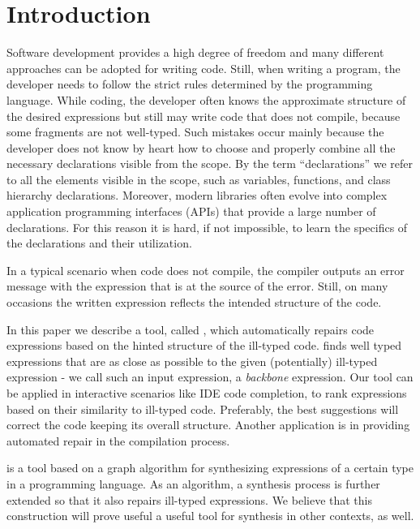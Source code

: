 \section{Introduction}
\label{sec:intro}

Software development provides a high degree of freedom and
many different approaches can be adopted for writing
code. Still, when writing a program, the developer needs to follow
the strict rules determined by the programming language. While coding, the developer often knows the
approximate structure of the desired expressions but still may write code
that does not compile, because some fragments are not well-typed.
Such mistakes occur mainly because the developer does not
know by heart how to choose and properly combine all the necessary
declarations visible from the scope. By the term ``declarations'' 
we refer to all the elements visible in the scope, such as variables, functions, and class
hierarchy declarations.
Moreover, modern libraries often evolve into complex 
application programming interfaces (APIs) that provide
a large number of declarations. For this reason 
it is hard, if not impossible, to learn the specifics of
the declarations and their utilization.

In a typical scenario when code does not compile, the compiler outputs
an error message with the expression that is at the source of the
error. Still, on many occasions the written expression reflects the
intended structure of the code. 

In this paper we describe a tool, called \ourTool, which
automatically repairs code expressions based on the hinted structure
of the ill-typed code. \ourTool finds well typed expressions that are as close as 
possible to the given (potentially) ill-typed expression - we call such an
input expression, a {\em backbone} expression. Our tool can be applied 
in interactive scenarios like IDE code completion, to rank expressions 
based on their similarity to ill-typed code. Preferably, the best
suggestions will correct the code keeping its overall structure.
Another application is in providing automated repair in the compilation process.

\ourTool is a tool based on a graph algorithm for synthesizing expressions of a certain type in a programming language. As an algorithm, a synthesis process is further 
extended so that it also repairs ill-typed expressions. We believe that this construction will prove useful a useful tool for synthesis in other contexts, as well.


